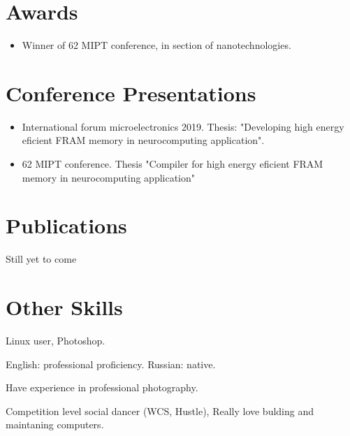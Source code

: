 \documentclass{article}
\begin{document}
\section{Awards}
\begin{itemize}
\item Winner of 62 MIPT conference, in section of nanotechnologies.
\end{itemize}

\section{Conference Presentations }

\begin{itemize}
\item International forum microelectronics 2019. Thesis: "Developing high energy eficient FRAM memory in neurocomputing application".
\item 62 MIPT conference. Thesis "Compiler for high energy eficient FRAM memory in neurocomputing application"
\end{itemize}


\section{Publications}
Still yet to come %


\section{Other Skills}
\begin{description}[widest=Langauges]
\item[Software]	Linux user, Photoshop.
\item[Languages]	English: professional proficiency.  Russian: native.
\item[Photography] Have experience in professional photography.
\item[Hobbies] Competition level social dancer (WCS, Hustle), Really love bulding and maintaning computers.
\end{description}
\end{document}
